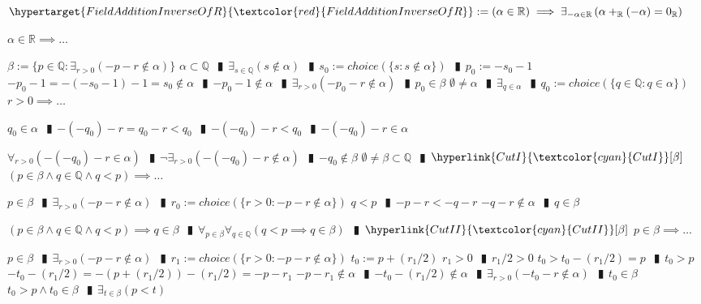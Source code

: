 \documentclass{book}
\newcommand{\df}[1]{\hypertarget{#1}{\textcolor{red}{#1}}}
\newcommand{\rf}[1]{\hyperlink{#1}{\textcolor{cyan}{#1}}}
\newcommand{\abr}{:=}
\newcommand{\pipe}{$\phantom{(}\vrectangleblack\phantom{)}$}
\newcommand{\pr}[1]{\left(#1\right)}
\begin{document}
$\df{FieldAdditionInverseOfR} \abr (\alpha \in \mathbb{R}) \implies \exists_{-\alpha \in \mathbb{R}}\pr{\alpha +_{\mathbb{R}} (-\alpha) = 0_{\mathbb{R}}}$
\begin{enumerate}
  \lit $\alpha \in \mathbb{R} \implies \ldots$
  \begin{enumerate}
    \lit $\beta \abr \{p \in \mathbb{Q} : \exists_{r > 0}(-p - r \notin \alpha)\}$
    \lit $\alpha \subset \mathbb{Q}$ \pipe $\exists_{s \in \mathbb{Q}}(s \notin \alpha)$ \pipe $s_0 \abr choice(\{s : s \notin \alpha\})$ \pipe $p_0 \abr -s_0 - 1$
    \lit $-p_0 - 1 = -(-s_0 - 1) - 1 = s_0 \notin \alpha$ \pipe $-p_0 - 1 \notin \alpha$ \pipe $\exists_{r > 0}(-p_0 - r \notin \alpha)$ \pipe $p_0 \in \beta$
    \lit $\emptyset \neq \alpha$ \pipe $\exists_{q \in \alpha}$ \pipe $q_0 \abr choice(\{q \in \mathbb{Q} : q \in \alpha\})$
    \lit $r > 0 \implies \ldots$
    \begin{enumerate}
      \lit $q_0 \in \alpha$ \pipe $-(-q_0) - r = q_0 - r < q_0$ \pipe $-(-q_0) - r < q_0$ \pipe $-(-q_0) - r \in \alpha$
    \end{enumerate}
    \lit $\forall_{r > 0}\pr{-(-q_0) - r \in \alpha}$ \pipe $\lnot \exists_{r > 0}\pr{-(-q_0) -r \notin \alpha}$ \pipe $-q_0 \notin \beta$
    \lit $\emptyset \neq \beta \subset \mathbb{Q}$ \pipe $\rf{CutI}[\beta]$
    \lit $(p \in \beta \land q \in \mathbb{Q} \land q < p) \implies \ldots$
    \begin{enumerate}
      \lit $p \in \beta$ \pipe $\exists_{r > 0}(-p - r \notin \alpha)$ \pipe $r_0 \abr choice(\{r > 0 : -p - r \notin \alpha\})$
      \lit $q < p$ \pipe $-p - r < -q - r$
      \lit $-q -r \notin \alpha$ \pipe $q \in \beta$
    \end{enumerate}
    \lit $(p \in \beta \land q \in \mathbb{Q} \land q < p) \implies q \in \beta$ \pipe $\forall_{p \in \beta} \forall_{q \in \mathbb{Q}}(q < p \implies q \in \beta)$ \pipe $\rf{CutII}[\beta]$
    \lit $p \in \beta \implies \ldots$
    \begin{enumerate}
      \lit $p \in \beta$ \pipe $\exists_{r > 0}(-p - r \notin \alpha)$ \pipe $r_1 \abr choice(\{r > 0 : -p - r \notin \alpha\})$
      \lit $t_0 \abr p + (r_1 / 2)$
      \lit $r_1 > 0$ \pipe $r_1 / 2 > 0$
      \lit $t_0 > t_0 - (r_1 / 2) = p$ \pipe $t_0 > p$
      \lit $-t_0 - (r_1 / 2) = -\pr{p + (r_1 / 2)} - (r_1 / 2) = -p - r_1$
      \lit $-p - r_1 \notin \alpha$ \pipe $-t_0 - (r_1 / 2) \notin \alpha$ \pipe $\exists_{r > 0}(-t_0 - r \notin \alpha)$ \pipe $t_0 \in \beta$
      \lit $t_0 > p \land t_0 \in \beta$ \pipe $\exists_{t \in \beta}(p < t)$

\end{enumerate}
\end{enumerate}
\end{enumerate}
\end{document}
